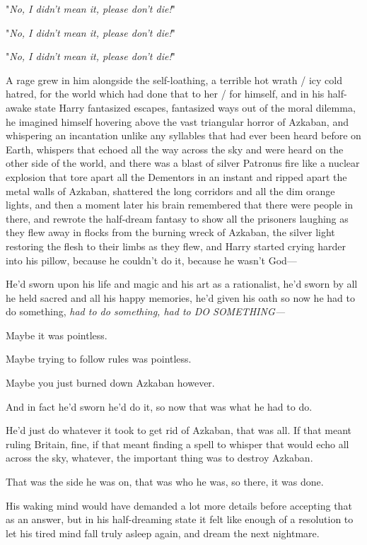 "\emph{No, I didn't mean it, please don't die!}"

"\emph{No, I didn't mean it, please don't die!}"

"\emph{No, I didn't mean it, please don't die!}"

A rage grew in him alongside the self-loathing, a terrible hot wrath / icy cold
hatred, for the world which had done that to her / for himself, and in his
half-awake state Harry fantasized escapes, fantasized ways out of the moral
dilemma, he imagined himself hovering above the vast triangular horror of
Azkaban, and whispering an incantation unlike any syllables that had ever been
heard before on Earth, whispers that echoed all the way across the sky and were
heard on the other side of the world, and there was a blast of silver Patronus
fire like a nuclear explosion that tore apart all the Dementors in an instant
and ripped apart the metal walls of Azkaban, shattered the long corridors and
all the dim orange lights, and then a moment later his brain remembered that
there were people in there, and rewrote the half-dream fantasy to show all the
prisoners laughing as they flew away in flocks from the burning wreck of
Azkaban, the silver light restoring the flesh to their limbs as they flew, and
Harry started crying harder into his pillow, because he couldn't do it, because
he wasn't God---

He'd sworn upon his life and magic and his art as a rationalist, he'd sworn by
all he held sacred and all his happy memories, he'd given his oath so now he
had to do something, \emph{had to do something, had to DO SOMETHING---}

Maybe it was pointless.

Maybe trying to follow rules was pointless.

Maybe you just burned down Azkaban however.

And in fact he'd sworn he'd do it, so now that was what he had to do.

He'd just do whatever it took to get rid of Azkaban, that was all. If that
meant ruling Britain, fine, if that meant finding a spell to whisper that would
echo all across the sky, whatever, the important thing was to destroy Azkaban.

That was the side he was on, that was who he was, so there, it was done.

His waking mind would have demanded a lot more details before accepting that as
an answer, but in his half-dreaming state it felt like enough of a resolution
to let his tired mind fall truly asleep again, and dream the next nightmare.
\sbreak
\vspace{-2\baselineskip}
